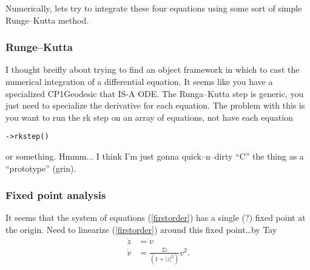 \documentclass[titlepage,12pt]{utarticle}
\begin{document}
Numerically, lets try to integrate these four equations
using some sort of simple Runge--Kutta method.

\subsubsection{Runge--Kutta}


I thought breifly about trying to find an object framework
in which to cast the numerical integration of a differential
equation.  It seems like you have a specialized CP1Geodesic
that IS-A ODE.  The Runga--Kutta step is generic, you just
need to specialize the derivative for each equation.  The problem
with this is you want to run the rk step on an array of
equations, not have each equation 
\begin{verbatim}
->rkstep() 
\end{verbatim}
or something.
Hmmm... I think I'm just gonna quick--n--dirty ``C'' the thing
as a ``prototype'' (grin).



\subsubsection{Fixed point analysis}

It seems that the system of equations (\ref{firstorder})
has a single (?) fixed point at the origin.
Need to linearize (\ref{firstorder}) around this
fixed point\dots by Tay
\begin{align}
{\dot z} &= v\\
{\dot v} &= \frac{2{\bar z}}
                   {(1 + |z|^2)}
              v^2.
\label{firstorder}
\end{align}





























%
\end{document}
